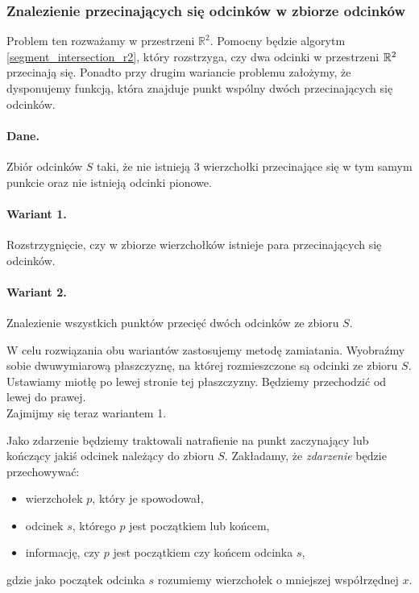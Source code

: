 \subsubsection{Znalezienie przecinających się odcinków w zbiorze odcinków}
Problem ten rozważamy w przestrzeni $\mathbb{R}^2$. Pomocny będzie 
algorytm \ref{segment_intersection_r2}, który rozstrzyga, czy dwa odcinki
w przestrzeni $\mathbb{R}^2$ przecinają się. Ponadto przy drugim wariancie problemu 
założymy, że dysponujemy funkcją, która znajduje punkt wspólny dwóch 
przecinających się odcinków. 

\paragraph{Dane.} Zbiór odcinków $S$ taki, że nie istnieją 3 wierzchołki przecinające
się w tym samym punkcie oraz nie istnieją odcinki pionowe.

\paragraph{Wariant 1.} Rozstrzygnięcie, czy w zbiorze wierzchołków istnieje 
para przecinających się odcinków.

\paragraph{Wariant 2.} Znalezienie wszystkich punktów przecięć dwóch odcinków ze zbioru $S$.

W celu rozwiązania obu wariantów zastosujemy metodę zamiatania. Wyobraźmy
sobie dwuwymiarową płaszczyznę, na której rozmieszczone są odcinki ze zbioru $S$.
Ustawiamy miotłę po lewej stronie tej płaszczyzny. Będziemy przechodzić od lewej do prawej.
\\

Zajmijmy się teraz wariantem 1.

Jako zdarzenie będziemy traktowali natrafienie na punkt zaczynający 
lub kończący jakiś odcinek należący do zbioru $S$.
Zakładamy, że \textit{zdarzenie} będzie przechowywać:
\begin{itemize}
	\item wierzchołek $p$, który je spowodował, 
	\item odcinek $s$, którego $p$ jest początkiem lub końcem,
	\item informację, czy $p$ jest początkiem czy końcem odcinka $s$,
\end{itemize}
gdzie jako początek odcinka $s$ rozumiemy wierzchołek o mniejszej współrzędnej $x$.

